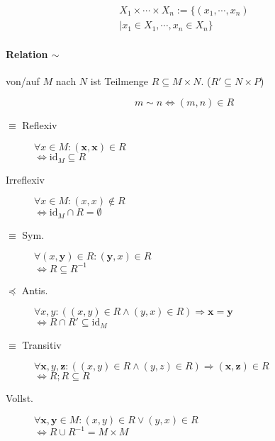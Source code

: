 \begin{gather*}
  X_1 \times \cdots \times X_n := \{ (x_1, \cdots, x_n) \\
  | x_1 \in X_1, \cdots, x_n \in X_n \}
\end{gather*}

\paragraph{Relation $\boldsymbol{\sim}$} von/auf $M$ nach $N$ ist Teilmenge $R \subseteq M \times N$. ($R' \subseteq N \times P$)

$$m \boldsymbol{\sim} n \Leftrightarrow (m, n) \in R$$

\begin{mzImportant}
  \begin{description}
    \item [$\boldsymbol{\equiv}$ Reflexiv]
          $\forall x \in M: (\mathbf{x}, \mathbf{x}) \in R$ \\
          $\Leftrightarrow \text{id}_M \subseteq R$

    \item [Irreflexiv]
          $\forall x \in M: (x, x) \boldsymbol{\notin} R$ \\
          $\Leftrightarrow \text{id}_M \cap R = \emptyset$

    \item [$\boldsymbol{\equiv}$ Sym.]
          $\forall (x,\mathbf{y}) \in R: (\mathbf{y}, x) \in R$ \\
          $\Leftrightarrow R \subseteq R^{-1}$

    \item [$\boldsymbol{\preceq}$ Antis.]
          $\forall x,y: ((x,y) \in R \land (y,x) \in R) \Rightarrow \mathbf{x = y}$ \\
          $\Leftrightarrow R \cap R' \subseteq \text{id}_M$

    \item [$\boldsymbol{\equiv}$ Transitiv]
          $\forall \mathbf{x},y,\mathbf{z}: ((x,y) \in R \land (y,z) \in R) \Rightarrow (\mathbf{x},\mathbf{z}) \in R$ \\
          $\Leftrightarrow R;R \subseteq R$

    \item [Vollst.]
          $\forall \mathbf{x},\mathbf{y} \in M: (x,y) \in R \lor (y,x) \in R$ \\
          $\Leftrightarrow R \cup R^{-1} = M \times M$
  \end{description}
\end{mzImportant}

